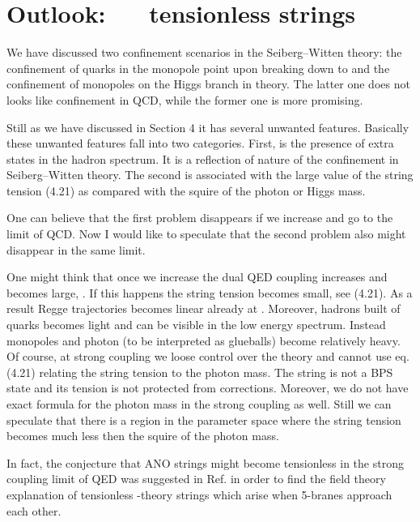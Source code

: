 \documentclass[a4paper,12pt]{article}
\begin{document}
\section{Outlook: ~~ tensionless strings}
\setcounter{equation}{0}



We have discussed two confinement scenarios in the
Seiberg--Witten theory: the confinement of quarks in the monopole
point upon breaking \coordHE{} down to \coordHE{} and the confinement of
monopoles on the Higgs branch in \coordHE{} theory. The latter one
does not looks like confinement in QCD, while the former one is
more promising.

Still as we have discussed in Section 4 it has several unwanted
features. Basically these unwanted features fall into two
categories. First, is the presence  of extra states in the
hadron spectrum. It is a reflection of \coordHE{} nature of the
confinement in Seiberg--Witten theory. The second is associated
with the large value of the string tension (4.21) as compared
with the squire of the photon or Higgs mass.

One can believe that the first problem disappears if we increase
\myHighlight{$\mu $}\coordHE{} and go to the limit of \coordHE{} QCD. Now I would like to
speculate that the second problem also might disappear in the
same limit.

One might think that once we increase \myHighlight{$\mu $}\coordHE{} the dual QED
coupling \coordHE{} increases and becomes large, \coordHE{}.
 If this happens the
string tension becomes small, see (4.21). As a result Regge
trajectories becomes linear already at \coordHE{}. Moreover,
hadrons built of quarks becomes light and can be visible in the low
energy spectrum. Instead monopoles and photon (to be interpreted
as glueballs) become relatively heavy. Of course, at strong coupling
we loose control over the theory and cannot use eq. (4.21) relating
the string tension to the photon mass. The string is not a BPS
state and its tension is not protected from corrections. Moreover,
we do not have exact formula for the photon mass in the strong coupling as
well. Still we can speculate that there is a region in the parameter
space where the string tension becomes much less then the 
squire of the photon mass.

In fact, the conjecture that ANO strings might become
tensionless in the strong coupling limit of QED was suggested in
Ref.\cite{HK} in order to find the field theory explanation of
tensionless \coordHE{}-theory strings which arise when 5-branes
approach each other.
\end{document}
